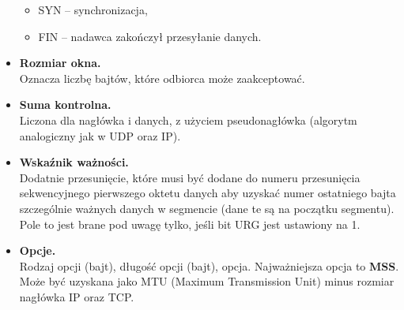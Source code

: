 \documentclass[a4paper]{article}
\begin{document}
\begin{itemize}
\begin{itemize}
        \item SYN – synchronizacja,
        \item FIN – nadawca zakończył przesyłanie danych.
    \end{itemize}
    \item \textbf{Rozmiar okna.}\\
     Oznacza liczbę bajtów, które odbiorca może zaakceptować.
     \item \textbf{Suma kontrolna.}\\
      Liczona dla nagłówka i danych, z użyciem pseudonagłówka (algorytm
analogiczny jak w UDP oraz IP).
    \item \textbf{Wskaźnik ważności.}\\
     Dodatnie przesunięcie, które musi być dodane do numeru przesunięcia
sekwencyjnego pierwszego oktetu danych aby uzyskać numer ostatniego bajta szczególnie
ważnych danych w segmencie (dane te są na początku segmentu). Pole to jest brane pod
uwagę tylko, jeśli bit URG jest ustawiony na 1.
    \item \textbf{Opcje.}\\
     Rodzaj opcji (bajt), długość opcji (bajt), opcja. Najważniejsza opcja to \textbf{MSS}. Może być uzyskana jako MTU (Maximum Transmission Unit) minus rozmiar nagłówka IP oraz TCP. 
\end{itemize}
\end{document}
